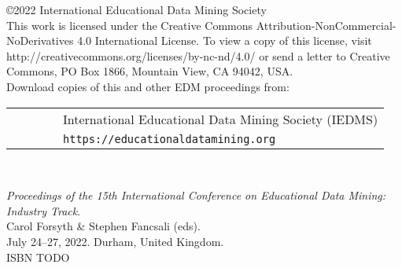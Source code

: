 \documentclass[letterpaper,11pt,oneside]{book} %
\begin{document}
\thispagestyle{empty}


%

\large
\noindent
\copyright 2022 International Educational Data Mining Society\\

This work is licensed under the Creative Commons Attribution-NonCommercial-NoDerivatives 4.0 International License. To view a copy of this license, visit http://creativecommons.org/licenses/by-nc-nd/4.0/ or send a letter to Creative Commons, PO Box 1866, Mountain View, CA 94042, USA.\\

Download copies of this and other EDM proceedings from:

\begin{tabular}{ll}
\ \ \ \ \ \ & International Educational Data Mining Society (IEDMS)\\
&{\tt https://educationaldatamining.org}\\
\end{tabular}\\

\vspace*{\fill}


\textit{Proceedings of the 15th International Conference on Educational Data Mining: Industry Track}.\\ Carol Forsyth \& Stephen Fancsali (eds).\\ July 24--27, 2022. 
    Durham, United Kingdom.\\
\noindent ISBN TODO\\
\end{document}
